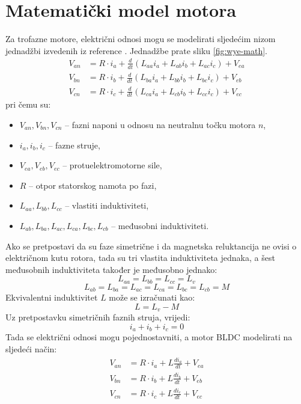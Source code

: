 \documentclass[diplomskirad]{fer}
\begin{document}
\section{Matematički model motora}
\label{sec:mat_model}
Za trofazne motore, električni odnosi mogu se modelirati sljedećim nizom jednadžbi izvedenih iz reference \cite{cite:pmsha}. Jednadžbe prate sliku \ref{fig:wye-math}.
\begin{align}
	V_{an} & = R \cdot i_a + \frac{d}{dt}(L_{aa}i_a + L_{ab}i_b + L_{ac}i_c) + V_{ea} \\
	V_{bn} & = R \cdot i_b + \frac{d}{dt}(L_{ba}i_a + L_{bb}i_b + L_{bc}i_c) + V_{eb} \\
	V_{cn} & = R \cdot i_c + \frac{d}{dt}(L_{ca}i_a + L_{cb}i_b + L_{cc}i_c) + V_{ec}
\end{align}
pri čemu su:
\begin{itemize}
	\item $V_{an}, V_{bn}, V_{cn}$ -- fazni naponi u odnosu na neutralnu točku motora $n$,
	\item $i_a, i_b, i_c$ -- fazne struje,
	\item $V_{ea}, V_{eb}, V_{ec}$ -- protuelektromotorne sile,
	\item $R$ -- otpor statorskog namota po fazi,
	\item $L_{aa}, L_{bb}, L_{cc}$ -- vlastiti induktiviteti,
	\item $L_{ab}, L_{ba}, L_{ac}, L_{ca}, L_{bc}, L_{cb}$ -- međusobni induktiviteti.
\end{itemize}
Ako se pretpostavi da su faze simetrične i da magnetska reluktancija ne ovisi o
električnom kutu rotora, tada su tri vlastita induktiviteta jednaka, a šest
međusobnih induktiviteta također je međusobno jednako:
\begin{equation}
	L_{aa} = L_{bb} = L_{cc} = L_v \tag{2.4}
\end{equation}
\begin{equation}
	L_{ab} = L_{ba} = L_{ac} = L_{ca} = L_{bc} = L_{cb} = M \tag{2.5}
\end{equation}
Ekvivalentni induktivitet $L$ može se izračunati kao:
\begin{equation}
	L = L_v - M \tag{2.6}
\end{equation}
Uz pretpostavku simetričnih faznih struja, vrijedi:
\begin{equation}
	i_a + i_b + i_c = 0 \tag{2.7}
\end{equation}
Tada se električni odnosi mogu pojednostavniti, a motor BLDC modelirati na
sljedeći način:
\begin{align}
	V_{an} & = R \cdot i_a + L\frac{di_a}{dt} + V_{ea} \\
	V_{bn} & = R \cdot i_b + L\frac{di_b}{dt} + V_{eb} \\
	V_{cn} & = R \cdot i_c + L\frac{di_c}{dt} + V_{ec}
\end{align}
\end{document}

